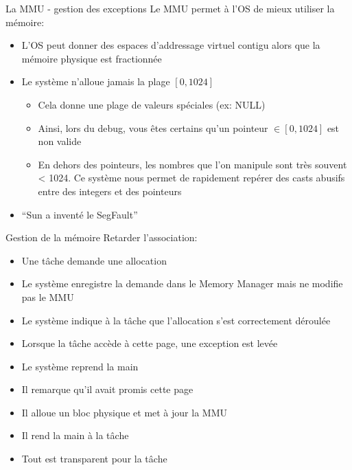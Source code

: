 \begin{frame}{La MMU - gestion des exceptions}
  Le MMU permet à l'OS de mieux utiliser la mémoire:
  \begin{itemize} 
  \item  L'OS peut  donner  des espaces  d'addressage virtuel  contigu
    alors que la mémoire physique est fractionnée
  \item Le système n'alloue jamais la plage $[0, 1024]$
    \begin{itemize}
    \item Cela donne une plage de valeurs spéciales (ex: NULL)
    \item Ainsi, lors du debug, vous êtes certains qu'un pointeur $\in
      [0, 1024]$ est non valide
    \item En dehors des pointeurs,  les nombres que l'on manipule sont
      très  souvent <  1024.   Ce système  nous  permet de  rapidement
      repérer des casts abusifs entre des integers et des pointeurs
    \end{itemize} 
  \item ``Sun a inventé le SegFault''
  \end{itemize} 
\end{frame}

\begin{frame}{Gestion de la mémoire}
  Retarder l'association:
  \begin{itemize}
  \item Une tâche demande une allocation
  \item Le système  enregistre la demande dans le  Memory Manager mais
    ne modifie pas le MMU
  \item  Le  système  indique   à  la  tâche  que  l'allocation  s'est
    correctement déroulée
  \item Lorsque la tâche accède à cette page, une exception est levée
  \item Le système reprend la main
  \item Il remarque qu'il avait promis cette page
  \item Il alloue un bloc physique et met à jour la MMU
  \item Il rend la main à la tâche
  \item Tout est transparent pour la tâche
  \end{itemize}
\end{frame}

